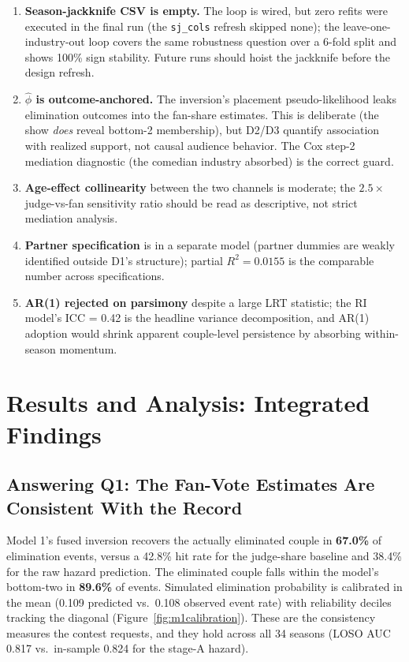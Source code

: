 \documentclass[10pt]{article}
\begin{document}
\begin{enumerate}[itemsep=1pt]
\item \textbf{Season-jackknife CSV is empty.} The loop is wired, but zero refits were
executed in the final run (the \texttt{sj\_cols} refresh skipped none); the
leave-one-industry-out loop covers the same robustness question over a 6-fold split and
shows 100\% sign stability. Future runs should hoist the jackknife before the design
refresh.
\item \textbf{$\hat\phi$ is outcome-anchored.} The inversion's placement pseudo-likelihood
leaks elimination outcomes into the fan-share estimates. This is deliberate (the show
\emph{does} reveal bottom-2 membership), but D2/D3 quantify association with realized
support, not causal audience behavior. The Cox step-2 mediation diagnostic (the comedian
industry absorbed) is the correct guard.
\item \textbf{Age-effect collinearity} between the two channels is moderate; the
$2.5\times$ judge-vs-fan sensitivity ratio should be read as descriptive, not strict
mediation analysis.
\item \textbf{Partner specification} is in a separate model (partner dummies are weakly
identified outside D1's structure); partial $R^2 = 0.0155$ is the comparable number across
specifications.
\item \textbf{AR(1) rejected on parsimony} despite a large LRT statistic; the RI model's
ICC = 0.42 is the headline variance decomposition, and AR(1) adoption would shrink apparent
couple-level persistence by absorbing within-season momentum.
\end{enumerate}

\section{Results and Analysis: Integrated Findings}
\label{sec:results}

\subsection{Answering Q1: The Fan-Vote Estimates Are Consistent With the Record}

Model 1's fused inversion recovers the actually eliminated couple in \textbf{67.0\%} of
elimination events, versus a 42.8\% hit rate for the judge-share baseline and 38.4\% for
the raw hazard prediction. The eliminated couple falls within the model's bottom-two in
\textbf{89.6\%} of events. Simulated elimination probability is calibrated in the mean
(0.109 predicted vs.\ 0.108 observed event rate) with reliability deciles tracking the
diagonal (Figure~\ref{fig:m1calibration}). These are the consistency measures the contest
requests, and they hold across all 34 seasons (LOSO AUC 0.817 vs.\ in-sample 0.824 for the
stage-A hazard).
\end{document}
